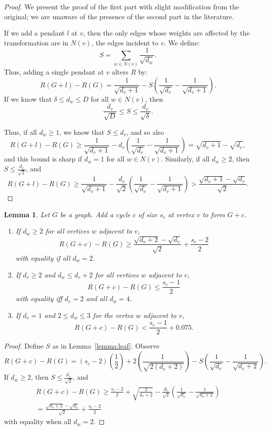 \documentclass{amsart}
\newtheorem{lemma}[thm]{Lemma}
\theoremstyle{definition}
\begin{document}
\begin{proof} 
We present the proof of the first part with slight modification from the original; we are unaware of the presence of the second part in the literature.

If we add a pendant $l$ at $v$, then the only edges whose weights are affected by the transformation are in $N(v)$, the edges incident to $v$. We define:
\[S = \sum_{w\in N(v)}\frac{1}{\sqrt{d_w}}.\]
Thus, adding a single pendant at $v$ alters $R$ by:
\[R(G+l)-R(G) = \frac{1}{\sqrt{d_v+1}}-S\left(\frac{1}{\sqrt{d_v}}-\frac{1}{\sqrt{d_v+1}}\right).\]
If we know that $\delta \leq d_w \leq D$ for all $w \in N(v)$, then
\[\frac{d_v}{\sqrt{D}} \leq S \leq \frac{d_v}{\sqrt{\delta}}.\]

Thus, if all $d_w \geq 1$, we know that $S \leq d_v$, and so also 
\[R(G+l)-R(G) \geq \frac{1}{\sqrt{d_v+1}}-d_v \left(\frac{1}{\sqrt{d_v}}-\frac{1}{\sqrt{d_v+1}}\right) = \sqrt{d_v+1}-\sqrt{d_v},\]
and this bound is sharp if $d_w=1$ for all $w \in N(v)$. Similarly, if all $d_w \geq 2$, then $S \leq \frac{d_v}{\sqrt 2}$, and
\[R(G+l)-R(G) \geq \frac{1}{\sqrt{d_v+1}}-\frac{d_v}{\sqrt 2} \left(\frac{1}{\sqrt{d_v}}-\frac{1}{\sqrt{d_v+1}}\right)
> \frac{\sqrt{d_v+1}-\sqrt{d_v}}{\sqrt 2}.\]
\end{proof}


\begin{lemma} \label{lemma:cycle}
Let $G$ be a graph. Add a cycle $c$ of size $s_c$ at vertex $v$ to form $G+c$.
\begin{enumerate}
\item \label{lemma:cycle1} If $d_w\geq2$ for all vertices $w$ adjacent to $v$,
\[R(G+c) - R(G) \geq \frac{\sqrt{d_v+2}-\sqrt{d_v}}{\sqrt 2} + \frac{s_c-2}{2}\] 
with equality if all $d_w=2$.
\item \label{lemma:cycle2} If $d_v \geq 2$ and $d_w \leq d_v+2$ for all vertices $w$ adjacent to $v$, 
\[R(G+c) - R(G) \leq \frac{s_c-1}{2}\] 
with equality iff $d_v=2$ and all $d_w=4$.
\item \label{lemma:cycle3} If $d_v = 1$ and $2 \leq d_w \leq 3$ for the vertex $w$ adjacent to $v$, 
\[R(G+c) - R(G) < \frac{s_c-1}{2} + 0.075.\] 
\end{enumerate}
\end{lemma}

\begin{proof}
Define $S$ as in Lemma~\ref{lemma:leaf}. Observe
\[R(G+c) - R(G) = (s_c-2)\left(\frac{1}{2}\right)+2\left(\frac{1\phantom{.}}{\sqrt{2(d_v+2)}}\right)-S\left(\frac{1}{\sqrt{d_v}}-\frac{1}{\sqrt{d_v+2}}\right).\]
If $d_w\geq 2$, then $S \leq \frac{d_v}{\sqrt 2}$, and
\begin{multline*}R(G+c) - R(G) \geq \frac{s_c-2}{2}+\sqrt{\frac{2}{d_v+2}}-\frac{d_v}{\sqrt2} \left(\frac{1}{\sqrt{d_v}}-\frac{1}{\sqrt{d_v+2}}\right)\\
= \frac{\sqrt{d_v+2}-\sqrt{d_v}}{\sqrt2}+\frac{s_c-2}{2}\end{multline*}
with equality when all $d_w=2$. 
\end{proof}
\end{document}
